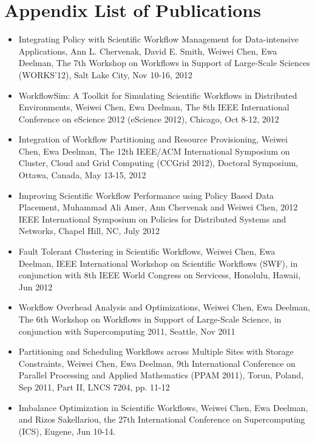 \chapter*{Appendix\vskip 20pt List of Publications}
\label{ch:listofpublications}


\begin{itemize}
	\item Integrating Policy with Scientific Workflow Management for Data-intensive Applications, Ann L. Chervenak, David E. Smith, Weiwei Chen, Ewa Deelman, The 7th Workshop on Workflows in Support of Large-Scale Sciences (WORKS'12), Salt Lake City, Nov 10-16, 2012
	\item WorkflowSim: A Toolkit for Simulating Scientific Workflows in Distributed Environments, Weiwei Chen, Ewa Deelman, The 8th IEEE International Conference on eScience 2012 (eScience 2012), Chicago, Oct 8-12, 2012
	\item Integration of Workflow Partitioning and Resource Provisioning, Weiwei Chen, Ewa Deelman, The 12th IEEE/ACM International Symposium on Cluster, Cloud and Grid Computing (CCGrid 2012), Doctoral Symposium, Ottawa, Canada, May 13-15, 2012
	\item Improving Scientific Workflow Performance using Policy Based Data Placement, Muhammad Ali Amer, Ann Chervenak and Weiwei Chen, 2012 IEEE International Symposium on Policies for Distributed Systems and Networks, Chapel Hill, NC, July 2012
    \item Fault Tolerant Clustering in Scientific Workflows, Weiwei Chen, Ewa Deelman, IEEE International Workshop on Scientific Workflows (SWF), in conjunction with 8th IEEE World Congress on Servicess, Honolulu, Hawaii, Jun 2012
    \item Workflow Overhead Analysis and Optimizations, Weiwei Chen, Ewa Deelman, The 6th Workshop on Workflows in Support of Large-Scale Science, in conjunction with Supercomputing 2011, Seattle, Nov 2011
    \item Partitioning and Scheduling Workflows across Multiple Sites with Storage Constraints, Weiwei Chen, Ewa Deelman, 9th International Conference on Parallel Processing and Applied Mathematics (PPAM 2011), Torun, Poland, Sep 2011, Part II, LNCS 7204, pp. 11-12
\item Imbalance Optimization in Scientific Workflows, Weiwei Chen, Ewa Deelman, and Rizos Sakellariou, the 27th International Conference on Supercomputing (ICS), Eugene, Jun 10-14.

\end{itemize}
